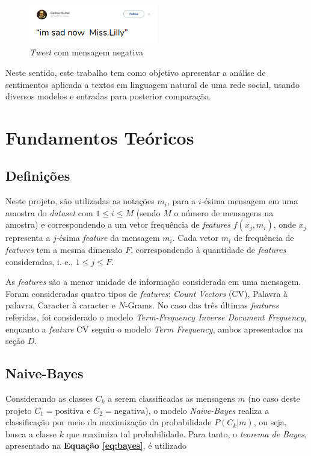 \documentclass[conference]{IEEEtran}
\begin{document}
\begin{figure}[htbp]
	\includegraphics[width=0.5\textwidth,center]{imgs/tweet_negativo.png}
	\caption{\textit{Tweet} com mensagem negativa}
	\label{fig:dataset_negativo}
\end{figure}

Neste sentido, este trabalho tem como objetivo apresentar a análise de
sentimentos aplicada a textos em linguagem natural de uma rede social, usando diversos modelos e entradas para posterior comparação.

\section{Fundamentos Teóricos}

\subsection{Definições}

Neste projeto, são utilizadas as notações $m_i$, para a $i$-ésima mensagem em uma amostra do \textit{dataset} com $1 \leq i \leq M$ (sendo $M$ o número de mensagens na amostra) e correspondendo a um vetor frequência de \textit{features} $f(x_{j}, m_i)$, onde $x_{j}$ representa a $j$-ésima \textit{feature} da mensagem $m_i$. Cada vetor $m_i$ de frequência de \textit{features} tem a mesma dimensão $F$, correspondendo à quantidade de \textit{features} consideradas, i. e., $1 \leq j \leq F$.

As \textit{features} são a menor unidade de informação considerada em uma mensagem. Foram consideradas quatro tipos de \textit{features}: \textit{Count Vectors} (CV), Palavra à palavra, Caracter à caracter e $N$-Grams. No caso das três últimas \textit{features} referidas, foi considerado o modelo \textit{Term-Frequency Inverse Document Frequency}, enquanto a \textit{feature} CV seguiu o modelo \textit{Term Frequency}, ambos apresentados na seção $D$.

\subsection{Naive-Bayes}

Considerando as classes $C_k$ a serem classificadas as mensagens $m$ (no caso deste projeto $C_1 = \text{positiva}$ e $C_2 = \text{negativa}$), o modelo \textit{Naive-Bayes} realiza a classificação por meio da maximização da probabilidade $P(C_k | m)$, ou seja, busca a classe $k$ que maximiza tal probabilidade. Para tanto, o \textit{teorema de Bayes}, apresentado na \textbf{Equação \eqref{eq:bayes}}, é utilizado
\end{document}
